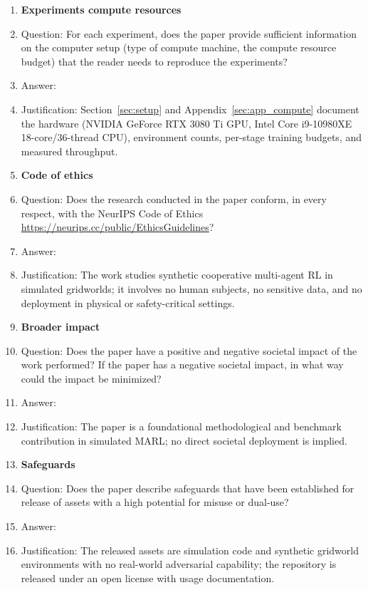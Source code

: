\begin{enumerate}
\item {\bf Experiments compute resources}
    \item[] Question: For each experiment, does the paper provide sufficient information on the computer setup (type of compute machine, the compute resource budget) that the reader needs to reproduce the experiments?
    \item[] Answer: \answerYes{}
    \item[] Justification: Section~\ref{sec:setup} and Appendix~\ref{sec:app_compute} document the hardware (NVIDIA GeForce RTX 3080 Ti GPU, Intel Core i9-10980XE 18-core/36-thread CPU), environment counts, per-stage training budgets, and measured throughput.

\item {\bf Code of ethics}
    \item[] Question: Does the research conducted in the paper conform, in every respect, with the NeurIPS Code of Ethics \url{https://neurips.cc/public/EthicsGuidelines}?
    \item[] Answer: \answerYes{}
    \item[] Justification: The work studies synthetic cooperative multi-agent RL in simulated gridworlds; it involves no human subjects, no sensitive data, and no deployment in physical or safety-critical settings.

\item {\bf Broader impact}
    \item[] Question: Does the paper have a positive and negative societal impact of the work performed? If the paper has a negative societal impact, in what way could the impact be minimized?
    \item[] Answer: \answerNA{}
    \item[] Justification: The paper is a foundational methodological and benchmark contribution in simulated MARL; no direct societal deployment is implied.

\item {\bf Safeguards}
    \item[] Question: Does the paper describe safeguards that have been established for release of assets with a high potential for misuse or dual-use?
    \item[] Answer: \answerYes{}
    \item[] Justification: The released assets are simulation code and synthetic gridworld environments with no real-world adversarial capability; the repository is released under an open license with usage documentation.


\end{enumerate}
